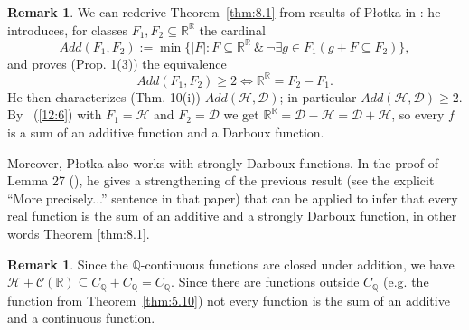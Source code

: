 \documentclass[11pt]{amsart} %
\theoremstyle{definition}
\newtheorem{remark}[theorem]{Remark}
\newcommand{\R}{\mathbb{R}}
\newcommand{\AD}{\mathcal{H}}
\begin{document}
\begin{remark}
\label{rem:8.4}
We can rederive Theorem~\ref{thm:8.1} from results of Płotka in \cite{15}: he introduces, for classes $F_{1}, F_{2}\subseteq\mathbb{R}^{\mathbb{R}}$ the cardinal
\begin{equation} Add(F_{1},F_{2}):=\min\{|F|:F\subseteq\mathbb{R}^{\mathbb{R}}\ \&\ \neg\exists g\in F_{1}(g+F\subseteq F_{2})\}, \end{equation} 
and proves (Prop. 1(3)) the equivalence
\begin{equation}
Add(F_{1},F_{2})\ge2\iff\mathbb{R}^{\mathbb{R}}=F_{2}-F_{1}.
\label{12:6}
\end{equation}
He then characterizes (Thm. 10(i)) 
$Add(\AD,\mathcal{D})$; in particular $Add(\AD,\mathcal{D})\ge2$. By ~(\ref{12:6}) with $F_{1}=\AD$ and $F_{2}=\mathcal{D}$ we get $\mathbb{R}^{\mathbb{R}}=\mathcal{D}-\AD=\mathcal{D}+\AD$, 
so every $f$ is a sum of an additive function and a Darboux function.

Moreover, Płotka also works with strongly Darboux functions. In the proof of Lemma 27 (\cite{15}), he gives a strengthening of the previous result  (see the explicit ``More precisely...'' sentence in that paper) that can be applied to infer that every real function is the sum of an additive and a strongly Darboux function, in other words Theorem \ref{thm:8.1}.
\end{remark}

\begin{remark}
\label{rem:8.5}
Since the $\mathbb{Q}$-continuous functions are closed under addition, we have $\AD+\mathcal{C}(\R) \subseteq C_\mathbb{Q}+C_\mathbb{Q}=C_\mathbb{Q}$. 
Since there are functions outside $C_\mathbb{Q}$ (e.g. the function from Theorem~\ref{thm:5.10}) not every function is the sum of an additive and a continuous function.
\end{remark}



\medskip



%
\end{document}
